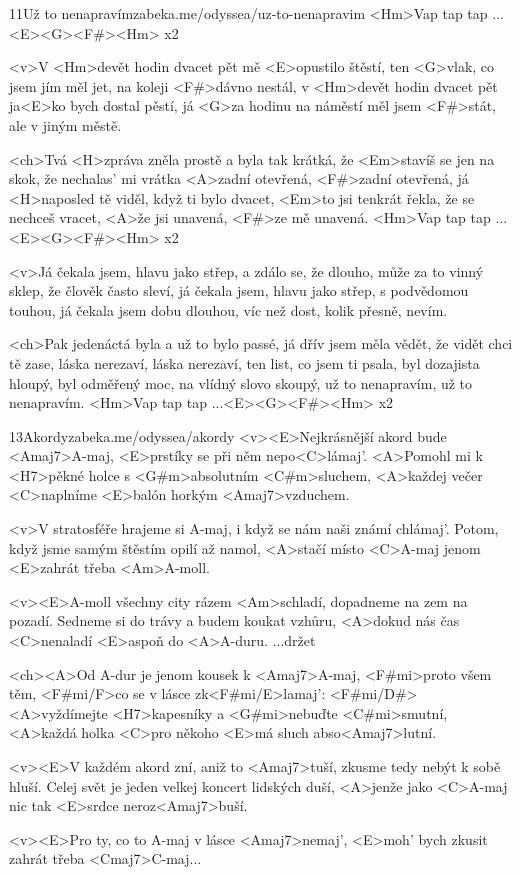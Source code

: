 \begin{song}{11}{Už to nenapravím}{zabeka.me/odyssea/uz-to-nenapravim}
	<Hm>Vap tap tap ...<E><G><F#><Hm> x2

	<v>V <Hm>devět hodin dvacet pět mě <E>opustilo štěstí,
	ten <G>vlak, co jsem jím měl jet, na koleji <F#>dávno nestál,
	v <Hm>devět hodin dvacet pět ja<E>ko bych dostal pěstí,
	já <G>za hodinu na náměstí měl jsem <F#>stát,
	ale v jiným městě.

	<ch>Tvá <H>zpráva zněla prostě a byla tak krátká,
	že <Em>stavíš se jen na skok, že nechalas' mi vrátka
	<A>zadní otevřená, <F#>zadní otevřená,
	já <H>naposled tě viděl, když ti bylo dvacet,
	<Em>to jsi tenkrát řekla, že se nechceš vracet,
	<A>že jsi unavená, <F#>ze mě unavená.
	<Hm>Vap tap tap ...<E><G><F#><Hm> x2

	<v>Já čekala jsem, hlavu jako střep, a zdálo se, že dlouho,
	může za to vinný sklep, že člověk často sleví,
	já čekala jsem, hlavu jako střep, s podvědomou touhou,
	já čekala jsem dobu dlouhou, víc než dost, kolik přesně, nevím.

	<ch>Pak jedenáctá byla a už to bylo passé,
	já dřív jsem měla vědět, že vidět chci tě zase,
	láska nerezaví, láska nerezaví,
	ten list, co jsem ti psala, byl dozajista hloupý,
	byl odměřený moc, na vlídný slovo skoupý,
	už to nenapravím, už to nenapravím.
	<Hm>Vap tap tap ...<E><G><F#><Hm> x2
\end{song}
\begin{song}{13}{Akordy}{zabeka.me/odyssea/akordy}
	<v><E>Nejkrásnější akord bude <Amaj7>A-maj,
	<E>prstíky se při něm nepo<C>lámaj'.
	<A>Pomohl mi k <H7>pěkné holce s <G#m>absolutním <C#m>sluchem,
	<A>každej večer <C>naplníme <E>balón horkým <Amaj7>vzduchem.

	<v>V stratosféře hrajeme si A-maj,
	i když se nám naši známí chlámaj'.
	Potom, když jsme samým štěstím opilí až namol,
	<A>stačí místo <C>A-maj jenom <E>zahrát třeba <Am>A-moll.

	<v><E>A-moll všechny city rázem <Am>schladí,
	dopadneme na zem na pozadí.
	Sedneme si do trávy a budem koukat vzhůru,
	<A>dokud nás čas <C>nenaladí <E>aspoň do <A>A-duru. ...držet

	<ch><A>Od A-dur je jenom kousek k <Amaj7>A-maj,
	<F#mi>proto všem těm, <F#mi/F>co se v lásce zk<F#mi/E>lamaj': <F#mi/D#>
	<A>vyždímejte <H7>kapesníky a <G#mi>nebuďte <C#mi>smutní,
	<A>každá holka <C>pro někoho <E>má sluch abso<Amaj7>lutní.

	<v><E>V každém akord zní, aniž to <Amaj7>tuší,
	zkusme tedy nebýt k sobě hluší.
	Celej svět je jeden velkej koncert lidských duší,
	<A>jenže jako <C>A-maj nic tak <E>srdce neroz<Amaj7>buší.

	<v><E>Pro ty, co to A-maj v lásce <Amaj7>nemaj',
	<E>moh' bych zkusit zahrát třeba <Cmaj7>C-maj...
\end{song}
